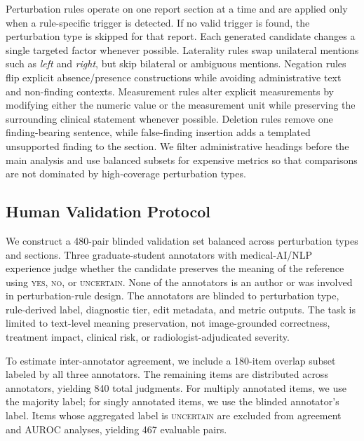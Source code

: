 \documentclass[11pt]{article}
\newcommand{\yes}{\textsc{yes}\xspace}
\newcommand{\no}{\textsc{no}\xspace}
\newcommand{\uncertain}{\textsc{uncertain}\xspace}
\begin{document}
Perturbation rules operate on one report section at a time and are applied only when a rule-specific trigger is detected. If no valid trigger is found, the perturbation type is skipped for that report. Each generated candidate changes a single targeted factor whenever possible. Laterality rules swap unilateral mentions such as \emph{left} and \emph{right}, but skip bilateral or ambiguous mentions. Negation rules flip explicit absence/presence constructions while avoiding administrative text and non-finding contexts. Measurement rules alter explicit measurements by modifying either the numeric value or the measurement unit while preserving the surrounding clinical statement whenever possible. Deletion rules remove one finding-bearing sentence, while false-finding insertion adds a templated unsupported finding to the section. We filter administrative headings before the main analysis and use balanced subsets for expensive metrics so that comparisons are not dominated by high-coverage perturbation types.

\subsection{Human Validation Protocol}

We construct a 480-pair blinded validation set balanced across perturbation types and sections. 
Three graduate-student annotators with medical-AI/NLP experience judge whether the candidate preserves the meaning of the reference using \yes, \no, or \uncertain. 
None of the annotators is an author or was involved in perturbation-rule design. 
The annotators are blinded to perturbation type, rule-derived label, diagnostic tier, edit metadata, and metric outputs. 
The task is limited to text-level meaning preservation, not image-grounded correctness, treatment impact, clinical risk, or radiologist-adjudicated severity.

To estimate inter-annotator agreement, we include a 180-item overlap subset labeled by all three annotators. 
The remaining items are distributed across annotators, yielding 840 total judgments. 
For multiply annotated items, we use the majority label; for singly annotated items, we use the blinded annotator's label. 
Items whose aggregated label is \uncertain are excluded from agreement and AUROC analyses, yielding 467 evaluable pairs.
\end{document}
